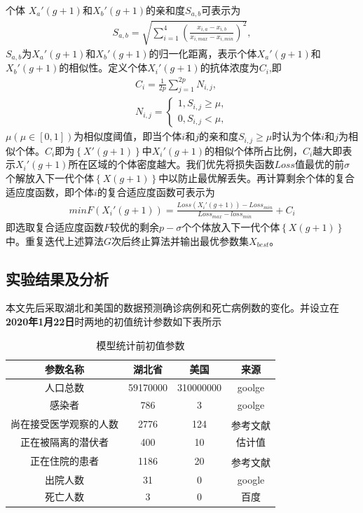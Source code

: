 \documentclass{whutmod}
\newcommand{\upcite}[1]{\textsuperscript{\cite{#1}}}
\begin{document}
		个体 $X_a '(g+1)$和$X_b '(g+1)$的亲和度$S_{a,b}$可表示为
		\begin{gather}
		S_{a,b}=\sqrt{\sum _{i=1}^4( \frac{x_{i,a}-x_{i,b}}{x_{i,max}-x_{i,min}})^2},
		\end{gather}
		$S_{a,b}$为$X_a '(g+1)$和$X_b '(g+1)$的归一化距离，表示个体$X_a '(g+1)$和$X_b '(g+1)$的相似性。定义个体$X_i '(g+1)$的抗体浓度为$C_{i}$,即
		\begin{gather*}
		C_{i}=\frac{1}{2p}\sum _{j=1}^{2p} N_{i,j},\\
		N_{i,j}=\left\{\begin{matrix}1,S_{i,j}\geqslant \mu ,
		\\ 0,S_{i,j}< \mu ,
		\end{matrix}\right.
		\end{gather*}
		$\mu(\mu\in[0,1])$为相似度阈值，即当个体$i$和$j$的亲和度$S_{i,j}\geqslant \mu$时认为个体$i$和$j$为相似个体。$C_{i}$即为$\left \{ X '(g+1)\right \}$中$X_i '(g+1)$的相似个体所占比例，$C_{i}$越大即表示$X_i '(g+1)$所在区域的个体密度越大。我们优先将损失函数$Loss$值最优的前$\sigma$个解放入下一代个体$\left \{ X(g+1)\right \}$中以防止最优解丢失。再计算剩余个体的复合适应度函数，即个体$i$的复合适应度函数可表示为
	    \begin{gather}
	  min F(X_i '(g+1))=\frac{Loss(X_i '(g+1))-Loss_{min}}{Loss_{max}-loss_{min}}+C_{i}
		\end{gather}
		即选取复合适应度函数$F$较优的剩余$p-\sigma$个个体放入下一代个体$\left \{ X(g+1)\right \}$中。重复迭代上述算法$G$次后终止算法并输出最优参数集$X_{best}$。
	
		
        \subsection{实验结果及分析}
        本文先后采取湖北和美国的数据预测确诊病例和死亡病例数的变化。并设立在\textbf{2020年1月22日}时两地的初值统计参数如下表所示
                	\begin{table}[H]
        	\centering		
        	\caption{模型统计前初值参数}\label{sdsssf}
        	\begin{tabular}{cccc}
        		\toprule[2pt]
        		\multicolumn{1}{m{4cm}}{\centering 参数名称}
        		& \multicolumn{1}{m{3cm}}{\centering 湖北省}
        		& \multicolumn{1}{m{3cm}}{\centering 美国}
        		& \multicolumn{1}{m{3cm}}{\centering 来源}
        		\\
        		\midrule[1pt]
        		人口总数&  59170000& 310000000&goolge\\ 
        		感染者&   786& 3&goolge\\ 
        		尚在接受医学观察的人数&  2776& 124&参考文献\upcite{2}\\ 
        		正在被隔离的潜伏者&  400& 10&估计值\\ 
        		 正在住院的患者&  1186& 20&参考文献\upcite{2}\\ 
        		 出院人数&  31& 0&google\\ 
        		死亡人数&  3& 0&百度\\ 
        		\bottomrule[2pt]	
        	\end{tabular}
        \end{table}
        
\end{document}
